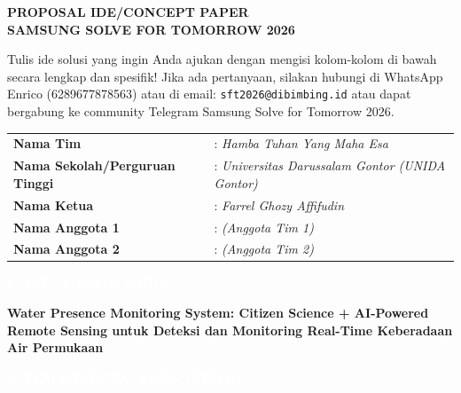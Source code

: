 \documentclass[12pt,a4paper]{article}
\title{}
\author{}
\date{}
\newcommand{\sectionbox}[1]{%
  \colorbox{samsungblue}{%
    \parbox{\textwidth}{%
      \textcolor{white}{\large\bfseries #1}%
    }%
  }%
}
\begin{document}
\thispagestyle{empty}
\vspace*{1cm}

\begin{center}
  \huge\textbf{PROPOSAL IDE/CONCEPT PAPER}\\[0.5cm]
  \huge\textbf{SAMSUNG SOLVE FOR TOMORROW 2026}\\[2cm]
\end{center}

\normalsize

Tulis ide solusi yang ingin Anda ajukan dengan mengisi kolom-kolom di bawah secara lengkap dan spesifik! Jika ada pertanyaan, silakan hubungi di WhatsApp Enrico (6289677878563) atau di email: \texttt{sft2026@dibimbing.id} atau dapat bergabung ke community Telegram Samsung Solve for Tomorrow 2026.

\vspace{1.5cm}

\begin{tabularx}{\textwidth}{|l|X|}
  \hline
  \textbf{Nama Tim} & : \textit{Hamba Tuhan Yang Maha Esa} \\[0.3cm]
  \textbf{Nama Sekolah/Perguruan Tinggi} & : \textit{Universitas Darussalam Gontor (UNIDA Gontor)} \\[0.3cm]
  \textbf{Nama Ketua} & : \textit{Farrel Ghozy Affifudin} \\[0.3cm]
  \textbf{Nama Anggota 1} & : \textit{(Anggota Tim 1)} \\[0.3cm]
  \textbf{Nama Anggota 2} & : \textit{(Anggota Tim 2)} \\[0.3cm]
  \hline
\end{tabularx}

\newpage

\sectionbox{1. JUDUL PROJEK/IDE}

\vspace{0.5cm}

\textbf{\Large Water Presence Monitoring System: Citizen Science + AI-Powered Remote Sensing untuk Deteksi dan Monitoring Real-Time Keberadaan Air Permukaan}

\vspace{1cm}

\sectionbox{2. TEMA/BIDANG YANG DIPILIH}
\end{document}
